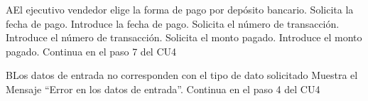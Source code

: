 		\begin{UCtrayectoriaA}{A}{El ejecutivo vendedor elige la forma de pago por depósito bancario.}
			\UCpaso Solicita la fecha de pago.
			\UCpaso[\UCactor] Introduce la fecha de pago.
			\UCpaso Solicita el número de transacción.
			\UCpaso[\UCactor] Introduce el número de transacción.
			\UCpaso Solicita el monto pagado.
			\UCpaso[\UCactor] Introduce el monto pagado.
			\UCpaso Continua en el paso 7 del {CU4}
		\end{UCtrayectoriaA}
		
		\begin{UCtrayectoriaA}{B}{Los datos de entrada no corresponden con el tipo de dato solicitado}
			\UCpaso Muestra el Mensaje ``Error en los datos de entrada''.
			\UCpaso Continua en el paso 4 del {CU4}
		\end{UCtrayectoriaA}

